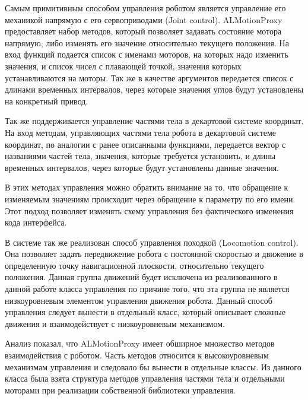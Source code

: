 Самым примитивным способом управления роботом является управление его механикой напрямую с его сервоприводами (Joint control).  ALMotionProxy предоставляет набор методов, который позволяет задавать состояние мотора напрямую, либо изменять его значение относительно текущего положения. На вход функций подается список с именами моторов, на которых надо изменить значения, и список чисел с плавающей точкой, значения которых устанавливаются на моторы. Так же в качестве аргументов передается список с длинами временных интервалов, через которые значения углов будут установлены на конкретный привод.

Так же поддерживается управление частями тела в декартовой системе координат. На вход методам, управляющих частями тела робота в декартовой системе координат, по аналогии с ранее описанными функциями, передается вектор с названиями частей тела, значения, которые требуется установить, и длины временных интервалов, через которые будут установлены данные значения.

В этих методах управления можно обратить внимание на то, что обращение к изменяемым значениям происходит через обращение к параметру по его имени. Этот подход позволяет изменять схему управления без фактического изменения кода интерфейса.

В системе так же реализован способ управления походкой (Locomotion control). Она позволяет задать передвижение робота с постоянной скоростью и движение в определенную точку навигационной плоскости, относительно текущего положения. Данная группа движений будет исключена из реализованного в данной работе класса управления по причине того, что эта группа не является низкоуровневым элементом управления движения робота. Данный способ управления следует вынести в отдельный класс, который описывает сложные движения и взаимодействует с низкоуровневым механизмом.

Анализ показал, что ALMotionProxy имеет обширное множество методов взаимодействия с роботом. Часть методов относится к высокоуровневым механизмам управления и следовало бы вынести в отдельные классы. Из данного класса была взята структура методов управления частями тела и отдельными моторами при реализации собственной библиотеки управления.